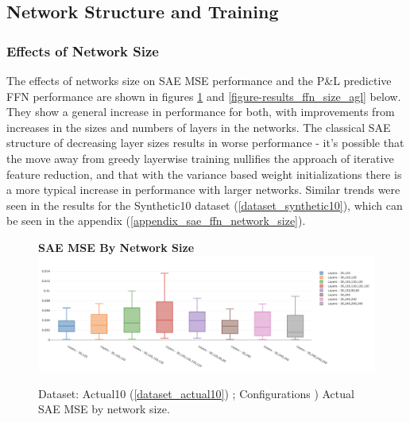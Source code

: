 \documentclass[a4paper,11pt,oneside]{article}
\theoremstyle{plain}
\theoremstyle{definition}
\begin{document}
\newpage
{}
\newpage

\subsection{Network Structure and Training}

\subsubsection{Effects of Network Size}

The effects of networks size on SAE MSE performance and the P\&L predictive FFN performance are shown in figures \ref{figure-results_sae_size_agl} and \ref{figure-results_ffn_size_agl} below. They show a general increase in performance for both, with improvements from increases in the sizes and numbers of layers in the networks. The classical SAE structure of decreasing layer sizes results in worse performance - it's possible that the move away from greedy layerwise training nullifies the approach of iterative feature reduction, and that with the variance based weight initializations there is a more typical increase in performance with larger networks. Similar trends were seen in the results for the Synthetic10 dataset (\ref{dataset_synthetic10}), which can be seen in the appendix (\ref{appendix_sae_ffn_network_size}).\newline

\begin{figure}[H]
	\centering 
	\textbf{SAE MSE By Network Size}
	\includegraphics[scale=0.35]{images/results/network/sae_mse_network_size.png} 
	\caption{Dataset: Actual10 (\ref{dataset_actual10}) ; Configurations )
		\newline Actual SAE MSE by network size.}
	\label{figure-results_sae_size_agl}
\end{figure}
\end{document}
